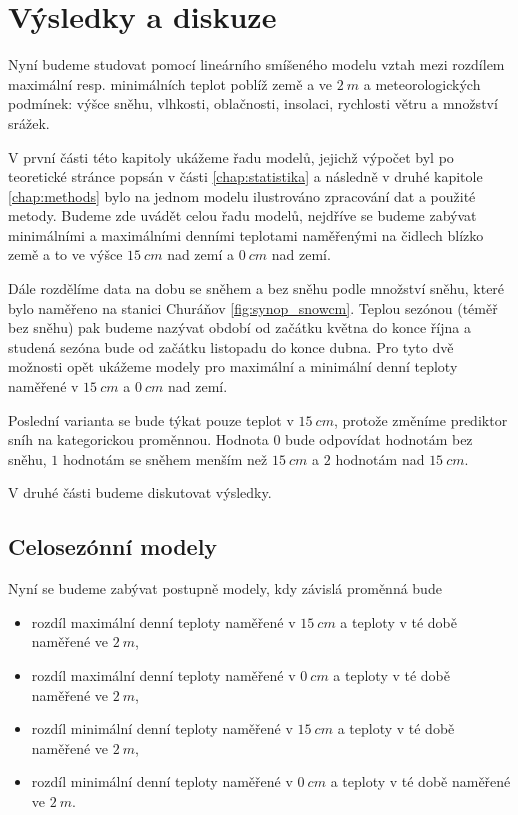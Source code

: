 \chapter{Výsledky a diskuze}\label{chap:ch3}
Nyní budeme studovat pomocí lineárního smíšeného modelu vztah mezi rozdílem maximální resp. minimálních teplot poblíž země a ve $\SI{2}{m}$ a meteorologických podmínek: výšce sněhu, vlhkosti, oblačnosti, insolaci, rychlosti větru a množství srážek.

V první části této kapitoly ukážeme řadu modelů, jejichž výpočet byl po teoretické stránce popsán v části \ref{chap:statistika} a následně v druhé kapitole \ref{chap:methods} bylo na jednom modelu ilustrováno zpracování dat a použité metody. Budeme zde uvádět celou řadu modelů, nejdříve se budeme zabývat minimálními a maximálními denními teplotami naměřenými na čidlech blízko země a to ve výšce $\SI{15}{cm}$ nad zemí a $\SI{0}{cm}$ nad zemí. 

Dále rozdělíme data na dobu se sněhem a bez sněhu podle množství sněhu, které bylo naměřeno na stanici Churáňov \ref{fig:synop_snowcm}. Teplou sezónou (téměř bez sněhu) pak budeme nazývat období od začátku května do konce října a studená sezóna bude od začátku listopadu do konce dubna. Pro tyto dvě možnosti opět ukážeme modely pro maximální a minimální denní teploty naměřené v $\SI{15}{cm}$ a $\SI{0}{cm}$ nad zemí.

Poslední varianta se bude týkat pouze teplot v $\SI{15}{cm}$, protože změníme prediktor sníh na kategorickou proměnnou. Hodnota $0$ bude odpovídat hodnotám bez sněhu, $1$ hodnotám se sněhem menším než $\SI{15}{cm}$ a $2$ hodnotám nad $\SI{15}{cm}$.

V druhé části budeme diskutovat výsledky.

\section{Celosezónní modely}
Nyní se budeme zabývat postupně modely, kdy závislá proměnná bude

\begin{itemize}
	\item rozdíl maximální denní teploty naměřené v $\SI{15}{cm}$ a teploty v té době naměřené ve $\SI{2}{m}$,
	\item rozdíl maximální denní teploty naměřené v $\SI{0}{cm}$ a teploty v té době naměřené ve $\SI{2}{m}$,
	\item rozdíl minimální denní teploty naměřené v $\SI{15}{cm}$ a teploty v té době naměřené ve $\SI{2}{m}$,
	\item rozdíl minimální denní teploty naměřené v $\SI{0}{cm}$ a teploty v té době naměřené ve $\SI{2}{m}$.
\end{itemize}

